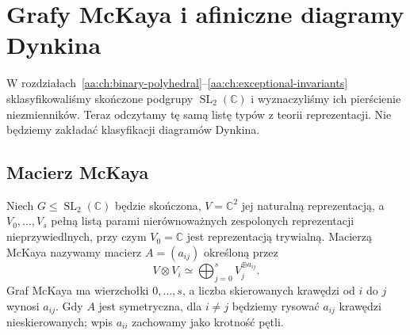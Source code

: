 \chapter{Grafy McKaya i afiniczne diagramy Dynkina}
\label{aa:ch:mckay}

W rozdziałach~\ref{aa:ch:binary-polyhedral}--\ref{aa:ch:exceptional-invariants}
sklasyfikowaliśmy skończone podgrupy $\operatorname{SL}_2(\mathbb C)$
i wyznaczyliśmy ich pierścienie niezmienników. Teraz
odczytamy tę samą listę typów z teorii reprezentacji.
Nie będziemy zakładać klasyfikacji diagramów Dynkina.

\section{Macierz McKaya}

\begin{definicja}
\label{aa:def:mckay}
Niech $G\le\operatorname{SL}_2(\mathbb C)$ będzie skończona,
$V=\mathbb C^2$ jej naturalną reprezentacją, a
$V_0,\ldots,V_s$ pełną listą parami nierównoważnych
zespolonych reprezentacji nieprzywiedlnych, przy czym
$V_0=\mathbb C$ jest reprezentacją trywialną.
Macierzą McKaya nazywamy macierz $A=(a_{ij})$ określoną przez
\[
 V\otimes V_i\simeq\bigoplus_{j=0}^s V_j^{\oplus a_{ij}}.
\]
Graf McKaya ma wierzchołki $0,\ldots,s$, a liczba
skierowanych krawędzi od $i$ do $j$ wynosi $a_{ij}$.
Gdy $A$ jest symetryczna, dla $i\ne j$ będziemy
rysować $a_{ij}$ krawędzi nieskierowanych; wpis
$a_{ii}$ zachowamy jako krotność pętli.
\end{definicja}

